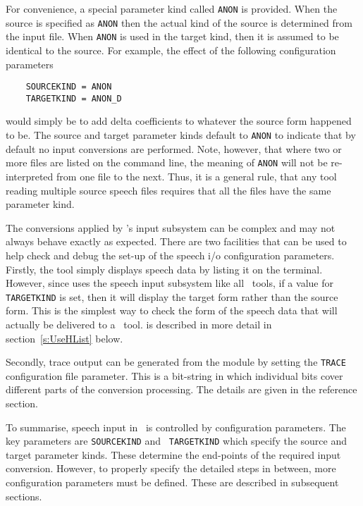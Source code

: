 For convenience, a special parameter kind called
\texttt{ANON} is provided.  When the source is
specified as \texttt{ANON} then the actual kind of the source is determined
from the input file.  When \texttt{ANON} is used in the target kind, then it is
assumed to be identical to the source.  For example, the effect of the
following configuration parameters
\begin{verbatim}
    SOURCEKIND = ANON
    TARGETKIND = ANON_D
\end{verbatim}
would simply be to add delta coefficients to whatever the source form
happened to be.  
The source and target parameter kinds default to \texttt{ANON}
to indicate that by default
no input conversions are performed.  Note, however, that where two or more
files are listed on the command line, the meaning of
\texttt{ANON} will not be re-interpreted from one file to the next.  Thus, it
is a general rule, that any tool reading multiple source speech files requires
that all the files have the same parameter kind.

The conversions applied by \HTK's input subsystem can be complex and may
not always behave exactly as expected.  There are two facilities that can 
be used to help check and debug the set-up of the speech i/o
configuration parameters.
Firstly, the tool  simply displays speech data by listing it
on the terminal.  However, since   uses the speech 
input subsystem like
all \HTK\ tools, if a value for \texttt{TARGETKIND} is set, then 
it will display the target
form rather than the source form.  This is the simplest way to check the form of
the speech data that will actually be delivered to a \HTK\ tool. 
  is described
in more detail in section~\ref{s:UseHList} below.

Secondly, trace output can be generated from the  module
by setting the \texttt{TRACE} configuration file parameter.  This is a
bit-string in which individual bits cover different parts of the
conversion processing.  The details are given in the reference section.

To summarise,  speech input in \HTK\ is controlled by  configuration
parameters. The key parameters  are \texttt{SOURCEKIND} and {\tt
TARGETKIND} which specify the source and target parameter kinds. 
These determine the end-points of the required input conversion.
However,  to properly specify the detailed steps in between,  more
configuration parameters must be defined.
These are described in subsequent sections.

